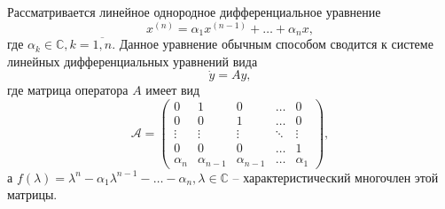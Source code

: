 Рассматривается линейное однородное дифференциальное уравнение
$$
	x^{(n)} = \alpha_{1}x^{(n-1)} + \ldots + \alpha_{n}x, 
$$
где $\alpha_{k} \in \mathbb{C}, k = \overline{1,n}$. Данное уравнение обычным способом сводится к системе
линейных дифференциальных уравнений вида
$$
	\dot{y} = Ay,
$$
где матрица оператора $A$ имеет вид
$$
	\mathcal{A} = \begin{pmatrix}
		0 & 1 & 0 & \dots & 0 \\
		0 & 0 & 1 & \dots & 0 \\
		\vdots & \vdots & \vdots & \ddots & \vdots \\
		0 & 0 & 0 & \dots & 1 \\
		\alpha_n & \alpha_{n-1} & \alpha_{n-1} & \dots & \alpha_1
	\end{pmatrix},
$$
а $f(\lambda) = \lambda^{n} - \alpha_{1}\lambda^{n-1} - \ldots - \alpha_{n}, \lambda \in \mathbb{C}$ -- характеристический многочлен этой матрицы.